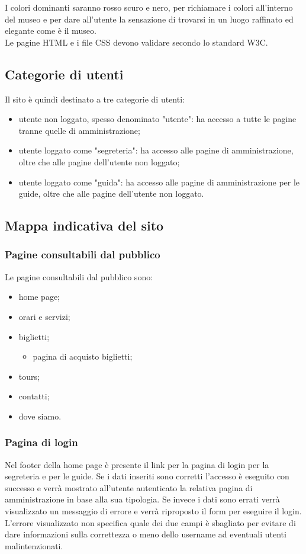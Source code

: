 \documentclass[10pt,a4paper,onecolumn]{article}
\begin{document}
 I colori dominanti saranno rosso scuro e nero, per richiamare i colori all'interno del museo e per dare all'utente la sensazione di trovarsi in un luogo raffinato ed elegante come è il museo.\\
 Le pagine HTML e i file CSS devono validare secondo lo standard W3C.

\subsection{Categorie di utenti}
Il sito è quindi destinato a tre categorie di utenti:
\begin{itemize}
\item utente non loggato, spesso denominato "utente": ha accesso a tutte le pagine tranne quelle di amministrazione;
\item utente loggato come "segreteria":  ha accesso alle pagine di amministrazione, oltre che alle pagine dell'utente non loggato;
\item utente loggato come "guida": ha accesso alle pagine di amministrazione per le guide, oltre che alle pagine dell'utente non loggato.
\end{itemize}

 \subsection{Mappa indicativa del sito}
 \subsubsection{Pagine consultabili dal pubblico}
 Le pagine consultabili dal pubblico sono:
  \begin{itemize}
 	\item home page;
 	\item orari e servizi;
 	\item biglietti;
    \begin{itemize}
 		\item pagina di acquisto biglietti;
    \end{itemize}
 	\item tours;
 	\item contatti;
 	\item dove siamo.
 \end{itemize}
 \subsubsection{Pagina di login}
 Nel footer della home page è presente il link per la pagina di login per la segreteria e per le guide. Se i dati inseriti sono corretti l'accesso è eseguito con successo e verrà mostrato all'utente autenticato la relativa pagina di amministrazione in base alla sua tipologia. Se invece i dati sono errati verrà visualizzato un messaggio di errore e verrà riproposto il form per eseguire il login. L'errore visualizzato non specifica quale dei due campi è sbagliato per evitare di dare informazioni sulla correttezza o meno dello username ad eventuali utenti malintenzionati.
\end{document}
